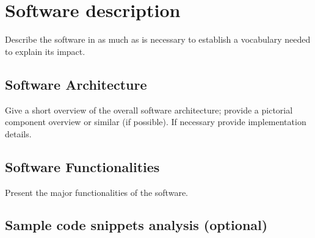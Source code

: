 \section{Software description}
\label{} 

Describe the software in as much as is necessary to establish a vocabulary needed to explain its impact. 


\subsection{Software Architecture}
\label{} 

Give a short overview of the overall software architecture; provide a pictorial component overview or similar (if possible). If necessary provide implementation details.


\subsection{Software Functionalities}
\label{} 

Present the major functionalities of the software.


\subsection{Sample code snippets analysis (optional)}
\label{} 
  
  